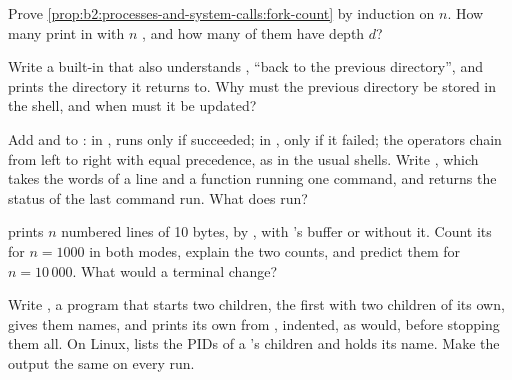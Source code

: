 \begin{exercise}[$\star\star$]\label{exo:b2:processes-and-system-calls:8}
Prove \cref{prop:b2:processes-and-system-calls:fork-count} by induction on $n$. How many  print in
 with $n$ , and how many of them have depth $d$?
\end{exercise}

\begin{exercise}[$\star\star$]\label{exo:b2:processes-and-system-calls:9}
Write a built-in  that also understands , ``back to the previous directory'', and prints the
directory it returns to. Why must the previous directory be stored in the shell, and when must it be updated?
\end{exercise}

\begin{exercise}[$\star\star\star$]\label{exo:b2:processes-and-system-calls:10}
Add \code{&&} and \code{||} to : in ,  runs only if  succeeded; in
, only if it failed; the operators chain from left to right with equal precedence, as in the usual
shells. Write , which takes the words of a line and a function running one command, and
returns the status of the last command run. What does  run?
\end{exercise}

\begin{exercise}[$\star\star\star$]\label{exo:b2:processes-and-system-calls:11}
 prints $n$ numbered lines of 10 bytes, by , with 's buffer or without it.
Count its   for $n = 1000$ in both modes, explain the two counts, and predict them for
$n = 10\,000$. What would a terminal change?
\end{exercise}

\begin{exercise}[$\star\star\star$]\label{exo:b2:processes-and-system-calls:12}
Write , a program that starts two children, the first with two children of its own, gives them names, and
prints its own  from , indented, as  would, before stopping them all. On Linux,
 lists the PIDs of a 's children and  holds its
name. Make the output the same on every run.
\end{exercise}

